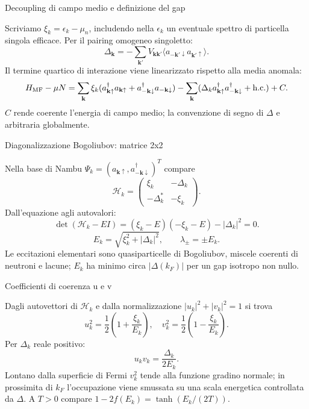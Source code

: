\begin{frame}[t]{Decoupling di campo medio e definizione del gap}
\vspace*{3mm}
\small

Scriviamo $\xi_k=\epsilon_k-\mu_n$, includendo nella $\epsilon_k$ un eventuale spettro di particella singola efficace.
Per il pairing omogeneo singoletto:
\[
\boxed{\Delta_{\mathbf k}=-\sum_{\mathbf k'}V_{\mathbf k\mathbf k'}
\langle a_{-\mathbf k'\downarrow}a_{\mathbf k'\uparrow}\rangle.}
\]
Il termine quartico di interazione viene linearizzato rispetto alla media anomala:
\[
H_{\rm MF}-\mu N=\sum_{\mathbf k}\xi_k
(a_{\mathbf k\uparrow}^{\dagger}a_{\mathbf k\uparrow}
+a_{-\mathbf k\downarrow}^{\dagger}a_{-\mathbf k\downarrow})
-\sum_{\mathbf k}(\Delta_k a_{\mathbf k\uparrow}^{\dagger}
 a_{-\mathbf k\downarrow}^{\dagger}+\mathrm{h.c.})+C.
\]
$C$ rende coerente l'energia di campo medio; la convenzione di segno di $\Delta$ e arbitraria globalmente.
\end{frame}

\begin{frame}[t]{Diagonalizzazione Bogoliubov: matrice 2x2}
\vspace*{3mm}
\small

Nella base di Nambu $\Psi_k=(a_{\mathbf k\uparrow},a_{-\mathbf k\downarrow}^{\dagger})^T$ compare
\[
\mathcal H_k=\begin{pmatrix}\xi_k&-\Delta_k\\
-\Delta_k^*&-\xi_k\end{pmatrix}.
\]
Dall'equazione agli autovalori:
\[
\det(\mathcal H_k-EI)=
(\xi_k-E)(-\xi_k-E)-|\Delta_k|^2=0.
\]
\[
\boxed{E_k=\sqrt{\xi_k^2+|\Delta_k|^2},\qquad\lambda_\pm=\pm E_k.}
\]
Le eccitazioni elementari sono quasiparticelle di Bogoliubov, miscele coerenti di neutroni e lacune; $E_k$ ha minimo circa $|\Delta(k_F)|$ per un gap isotropo non nullo.
\end{frame}

\begin{frame}[t]{Coefficienti di coerenza u e v}
\vspace*{3mm}
\small

Dagli autovettori di $\mathcal H_k$ e dalla normalizzazione $|u_k|^2+|v_k|^2=1$ si trova
\[
\boxed{u_k^2=\frac12\left(1+\frac{\xi_k}{E_k}\right),\quad
v_k^2=\frac12\left(1-\frac{\xi_k}{E_k}\right).}
\]
Per $\Delta_k$ reale positivo:
\[
u_kv_k=\frac{\Delta_k}{2E_k}.
\]
Lontano dalla superficie di Fermi $v_k^2$ tende alla funzione gradino normale; in prossimita di $k_F$ l'occupazione viene smussata su una scala energetica controllata da $\Delta$.
A $T>0$ compare $1-2f(E_k)=\tanh(E_k/(2T))$.
\end{frame}

